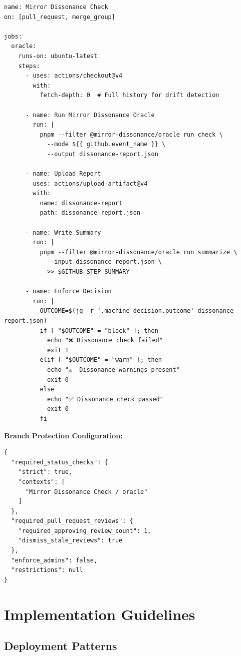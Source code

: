 \documentclass[11pt,a4paper]{article}
\begin{document}
\begin{verbatim}
name: Mirror Dissonance Check
on: [pull_request, merge_group]

jobs:
  oracle:
    runs-on: ubuntu-latest
    steps:
      - uses: actions/checkout@v4
        with:
          fetch-depth: 0  # Full history for drift detection
      
      - name: Run Mirror Dissonance Oracle
        run: |
          pnpm --filter @mirror-dissonance/oracle run check \
            --mode ${{ github.event_name }} \
            --output dissonance-report.json
      
      - name: Upload Report
        uses: actions/upload-artifact@v4
        with:
          name: dissonance-report
          path: dissonance-report.json
      
      - name: Write Summary
        run: |
          pnpm --filter @mirror-dissonance/oracle run summarize \
            --input dissonance-report.json \
            >> $GITHUB_STEP_SUMMARY
      
      - name: Enforce Decision
        run: |
          OUTCOME=$(jq -r '.machine_decision.outcome' dissonance-report.json)
          if [ "$OUTCOME" = "block" ]; then
            echo "❌ Dissonance check failed"
            exit 1
          elif [ "$OUTCOME" = "warn" ]; then
            echo "⚠️  Dissonance warnings present"
            exit 0
          else
            echo "✅ Dissonance check passed"
            exit 0
          fi
\end{verbatim}

\textbf{Branch Protection Configuration:}

\begin{verbatim}
{
  "required_status_checks": {
    "strict": true,
    "contexts": [
      "Mirror Dissonance Check / oracle"
    ]
  },
  "required_pull_request_reviews": {
    "required_approving_review_count": 1,
    "dismiss_stale_reviews": true
  },
  "enforce_admins": false,
  "restrictions": null
}
\end{verbatim}

\section{Implementation Guidelines}

\subsection{Deployment Patterns}
\end{document}
